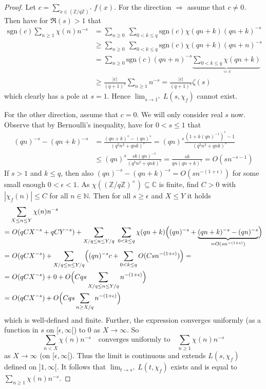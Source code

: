 \documentclass{scrartcl}
\newcommand{\N}{\mathbb{N}}
\newcommand{\Z}{\mathbb{Z}}
\newcommand{\C}{\mathbb{C}}
\newcommand{\units}{\times}
\newcommand{\sgn}{\mathrm{sgn}}
\theoremstyle{definition}
\begin{document}
\begin{proof}
    Let $c = \sum_{x \in (\Z/q\Z)^\units} f(x)$.
    For the direction $\Rightarrow$ assume that $c \neq 0$.
    Then have for $\Re(s) > 1$ that
    \begin{align*}
        \sgn(c) \sum_{n \geq 1} \chi(n) n^{-s} &= \sum_{n \geq 0} \ \sum_{0 < k \leq q} \sgn(c) \chi(qn + k) (qn + k)^{-s} \\
        &\geq \sum_{n \geq 0} \ \sum_{0 < k \leq q}\sgn(c) \chi(qn + k) (qn + n)^{-s} \\
        &= \sum_{n \geq 0} \sgn(c) (qn + n)^{-s} \underbrace{\sum_{0 < k \leq q} \chi(qn + k)}_{= c} \\
        &\geq \frac {|c|} {(q + 1)^s} \sum_{n \geq 1} n^{-s} = \frac {|c|} {(q + 1)^s} \zeta(s)
    \end{align*}
    which clearly has a pole at $s = 1$. Hence $\lim_{s \to 1^+} L(s, \chi_f)$ cannot exist.

    For the other direction, assume that $c = 0$.
    We will only consider real $s$ now.
    Observe that by Bernoulli's inequality, have for $0 < s \leq 1$ that
    \begin{align*}
        (qn)^{-s} - (qn + k)^{-s} &= \frac {(qn + k)^s - (qn)^s} {(q^2n^2 + qnk)^s} = (qn)^{s} \frac {(1 + k(qn)^{-1})^s - 1} {(q^2n^2 + qnk)^s} \\
        &\leq (qn)^s \frac {sk(qn)^{-1}} {(q^2n^2 + qnk)^s} = \frac {sk} {qn(qn + k)^s} = O(sn^{-s - 1})
    \end{align*}
    If $s > 1$ and $k \leq q$, then also $(qn)^{-s} - (qn + k)^{-s} = O(sn^{-(1 + \epsilon)})$ for some small enough $0 < \epsilon < 1$.
    As $\chi((\Z/q\Z)^\units) \subseteq \C$ is finite, find $C > 0$ with $|\chi_f(n)| \leq C$ for all $n \in \N$. 
    Then for all $s \geq \epsilon$ and $X \leq Y$ it holds
    \begin{align*}
        &\sum_{X \leq n \leq Y} \chi(n) n^{-s} \\
        =& \ O(qCX^{-s} + qCY^{-s}) + \sum_{X/q \leq n \leq Y/q} \ \sum_{0 < k \leq q} \chi(qn + k) \Bigl( (qn)^{-s} + \underbrace{(qn + k)^{-s} - (qn)^{-s}}_{= O(sn^{-(1 + \epsilon)})} \Bigr) \\
        =& \ O(qCX^{-s}) + \sum_{X/q \leq n \leq Y/q} \Bigl( (qn)^{-s} c + \sum_{0 < k \leq q} O(Csn^{-(1 + \epsilon)}) \Bigr) = \\
        =& \ O(qCX^{-s}) + 0 + O\Bigl( Cqs \sum_{X/q \leq n \leq Y/q} n^{-(1 + \epsilon)} \Bigr) \\
        =& \ O(qCX^{-s}) + O\Bigl( Cqs \sum_{n \geq X/q} n^{-(1 + \epsilon)} \Bigr)
    \end{align*}
    which is well-defined and finite.
    Further, the expression converges uniformly (as a function in $s$ on $[\epsilon, \infty[$) to $0$ as $X \to \infty$. 
    So
    \begin{equation*}
        \sum_{n < X} \chi(n) n^{-s} \quad \text{converges uniformly to} \quad \sum_{n \geq 1} \chi(n) n^{-s}
    \end{equation*}
    as $X \to \infty$ (on $[\epsilon, \infty[$). 
    Thus the limit is continuous and extends $L(s, \chi_f)$ defined on $]1, \infty[$.
    It follows that $\lim_{t \to s^+} L(t, \chi_f)$ exists and is equal to $\sum_{n \geq 1} \chi(n) n^{-s}$.
\end{proof}
\end{document}

